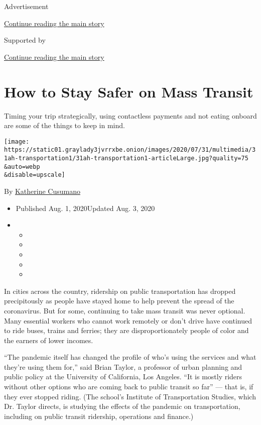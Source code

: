 Advertisement

\protect\hyperlink{after-top}{Continue reading the main story}

Supported by

\protect\hyperlink{after-sponsor}{Continue reading the main story}

\hypertarget{how-to-stay-safer-on-mass-transit}{%
\section{How to Stay Safer on Mass
Transit}\label{how-to-stay-safer-on-mass-transit}}

Timing your trip strategically, using contactless payments and not
eating onboard are some of the things to keep in mind.

\texttt{[image: https://static01.graylady3jvrrxbe.onion/images/2020/07/31/multimedia/31ah-transportation1/31ah-transportation1-articleLarge.jpg?quality=75\\\&auto=webp\\\&disable=upscale]}

By
\href{https://www.nytimes3xbfgragh.onion/by/katherine-cusumano}{Katherine
Cusumano}

\begin{itemize}
\item
  Published Aug. 1, 2020Updated Aug. 3, 2020
\item
  \begin{itemize}
  \item
  \item
  \item
  \item
  \item
  \end{itemize}
\end{itemize}

In cities across the country, ridership on public transportation has
dropped precipitously as people have stayed home to help prevent the
spread of the coronavirus. But for some, continuing to take mass transit
was never optional. Many essential workers who cannot work remotely or
don't drive have continued to ride buses, trains and ferries; they are
disproportionately people of color and the earners of lower incomes.

``The pandemic itself has changed the profile of who's using the
services and what they're using them for,'' said Brian Taylor, a
professor of urban planning and public policy at the University of
California, Los Angeles. ``It is mostly riders without other options who
are coming back to public transit so far'' --- that is, if they ever
stopped riding. (The school's Institute of Transportation Studies, which
Dr. Taylor directs, is studying the effects of the pandemic on
transportation, including on public transit ridership, operations and
finance.)

